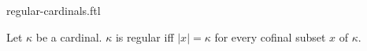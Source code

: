 \documentclass{naproche-library}
\begin{document}
\begin{smodule}[title=Regular Cardinals]{regular-cardinals.ftl}

\begin{definition}[forthel,id=SET_THEORY_06_6532641205487950]
  Let $\kappa$ be a cardinal.
  $\kappa$ is regular iff $|x| = \kappa$ for every cofinal subset $x$ of $\kappa$.
\end{definition}
\end{smodule}
\end{document}
